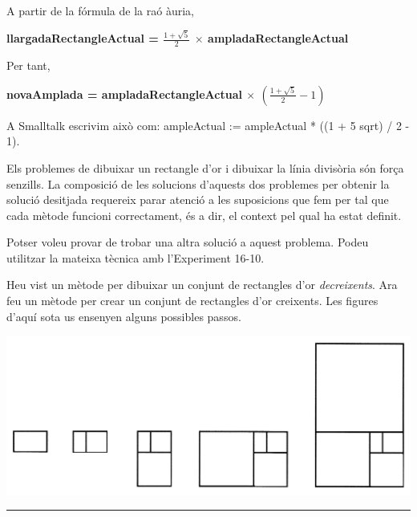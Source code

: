 \begin{itemize}
\begin{itemize}
\noindent
A partir de la fórmula de la raó àuria, 
\vspace*{2mm}

\noindent
{\bf llargadaRectangleActual = $\frac{1 + \sqrt{5}}{2}$ $\times$ ampladaRectangleActual}
\vspace*{2mm}

\noindent
Per tant,
\vspace*{2mm}

\noindent
{\bf novaAmplada = ampladaRectangleActual $\times$ $\left( \frac{1 + \sqrt{5}}{2} - 1\right)$}
\vspace*{2mm}

\noindent
A Smalltalk escrivim això com: \textsf{ampleActual := ampleActual * ((1 + 5 sqrt) / 2 - 1)}.
\end{itemize}
\end{itemize}

Els problemes de dibuixar un rectangle d'or i dibuixar la línia divisòria són força senzills. La composició de les solucions d'aquests dos problemes per obtenir la solució desitjada requereix parar atenció a les suposicions que fem per tal que cada mètode funcioni correctament, és a dir, el context pel qual ha estat definit.

Potser voleu provar de trobar una altra solució a aquest problema. Podeu utilitzar la mateixa tècnica amb l'Experiment 16-10.

\begin{center}
\colorbox{black}{}
\end{center}
{\small
\noindent
Heu vist un mètode per dibuixar un conjunt de rectangles d'or \emph{decreixents}. Ara feu un mètode per crear un conjunt de rectangles d'or creixents. Les figures d'aquí sota us ensenyen alguns possibles passos.}
\begin{center}
\includegraphics[scale=0.1]{Imatges/figuraE16-10.jpg} 
\end{center}
\noindent
\rule{\textwidth}{3pt}

